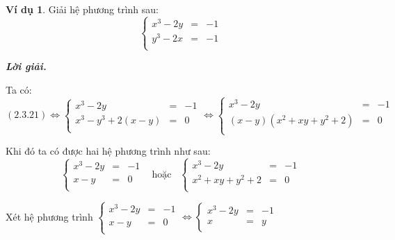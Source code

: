 \documentclass[12pt,a4paper,oneside]{book}
\theoremstyle{theorem}
\theoremstyle{definition}
\newtheorem{vd}[theorem2]{Ví dụ}
\begin{document}
\begin{vd}
     Giải hệ phương trình sau:
    \begin{equation}
\left\{
\begin{array}{lcl}
\displaystyle x^3-2y&=& -1\\[1.5ex]
\displaystyle y^3-2x&=&-1\\   
\end{array}
\right.
 \end{equation}

 \textbf{\textit{Lời giải.}}

Ta có: \[(2.3.21)\Leftrightarrow\left\{
\begin{array}{lcl}
\displaystyle x^3-2y&=& -1\\[1.5ex]
\displaystyle x^3-y^3+2(x-y)&=&0\\   
\end{array}
\right.\Leftrightarrow\left\{
\begin{array}{lcl}
\displaystyle x^3-2y&=& -1\\[1.5ex]
\displaystyle (x-y)\left(x^2+xy+y^2+2\right)&=&0\\   
\end{array}
\right.\] 

Khi đó ta có được hai hệ phương trình như sau:
\[\left\{
\begin{array}{lcl}
\displaystyle x^3-2y&=& -1\\[1.5ex]
\displaystyle x-y&=&0\\
\end{array}
\right.\hspace{10pt}\text{hoặc}\hspace{10pt}\left\{
\begin{array}{lcl}
\displaystyle x^3-2y&=&- 1\\[1.5ex]
\displaystyle x^2+xy+y^2+2&=&0\\
\end{array}
\right.\]

Xét hệ phương trình $\left\{
\begin{array}{lcl}
\displaystyle x^3-2y&=& -1\\[1.5ex]
\displaystyle x-y&=&0\\
\end{array}
\right.\Leftrightarrow\left\{
\begin{array}{lcl}
\displaystyle x^3-2y&=& -1\\[1.5ex]
\displaystyle x&=&y\\
\end{array}
\right.$


\end{vd}
\end{document}
